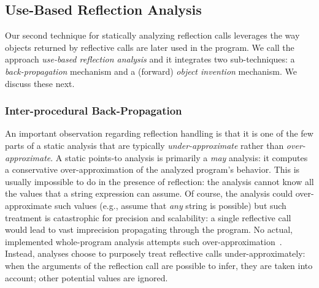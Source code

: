 
\subsection{Use-Based Reflection Analysis}
\label{reflection/sec:use-based}

Our second technique for statically analyzing reflection calls
leverages the way objects returned by reflective calls are later used
in the program.  We call the approach \emph{use-based reflection
  analysis} and it integrates two sub-techniques: a
\emph{back-propagation} mechanism and a (forward) \emph{object
  invention} mechanism.  We discuss these next.

\subsubsection{Inter-procedural Back-Propagation}
\label{reflection/sec:back-propagation}

An important observation regarding reflection handling is that it is
one of the few parts of a static analysis that are typically
\emph{under-approximate} rather than \emph{over-approximate}.  A
static points-to analysis is primarily a \emph{may} analysis: it
computes a conservative over-approximation of the analyzed program's
behavior. This is usually impossible to do in the presence of
reflection: the analysis cannot know all the values that a string
expression can assume. Of course, the analysis could over-approximate
such values (e.g., assume that \emph{any} string is possible) but such
treatment is catastrophic for precision and scalability: a single
reflective call would lead to vast imprecision propagating through the
program. No actual, implemented whole-program analysis attempts such
over-approximation~\cite{soundiness15}. Instead, analyses choose to
purposely treat reflective calls under-approximately: when the
arguments of the reflection call are possible to infer, they are taken
into account; other potential values are ignored.


